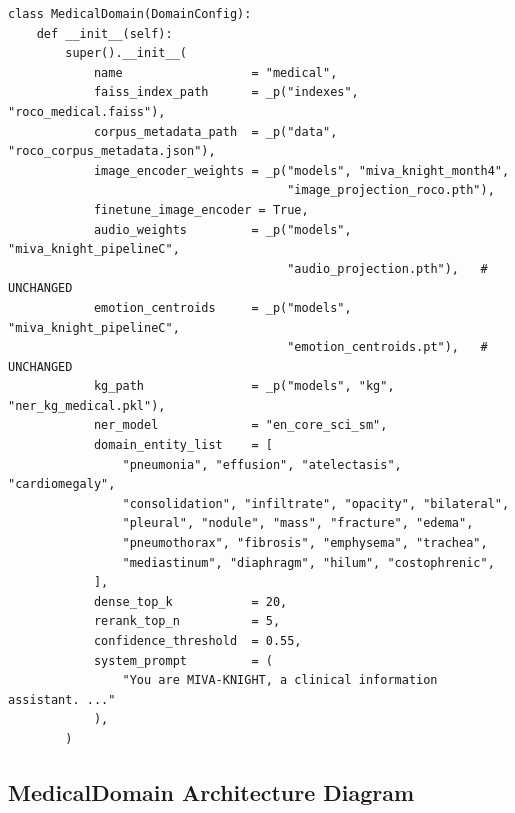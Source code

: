 \documentclass[12pt,a4paper]{article}
\theoremstyle{definition}
\theoremstyle{remark}
\begin{document}
\begin{lstlisting}[caption={\texttt{MedicalDomain} class}]
class MedicalDomain(DomainConfig):
    def __init__(self):
        super().__init__(
            name                  = "medical",
            faiss_index_path      = _p("indexes", "roco_medical.faiss"),
            corpus_metadata_path  = _p("data", "roco_corpus_metadata.json"),
            image_encoder_weights = _p("models", "miva_knight_month4",
                                       "image_projection_roco.pth"),
            finetune_image_encoder = True,
            audio_weights         = _p("models", "miva_knight_pipelineC",
                                       "audio_projection.pth"),   # UNCHANGED
            emotion_centroids     = _p("models", "miva_knight_pipelineC",
                                       "emotion_centroids.pt"),   # UNCHANGED
            kg_path               = _p("models", "kg", "ner_kg_medical.pkl"),
            ner_model             = "en_core_sci_sm",
            domain_entity_list    = [
                "pneumonia", "effusion", "atelectasis", "cardiomegaly",
                "consolidation", "infiltrate", "opacity", "bilateral",
                "pleural", "nodule", "mass", "fracture", "edema",
                "pneumothorax", "fibrosis", "emphysema", "trachea",
                "mediastinum", "diaphragm", "hilum", "costophrenic",
            ],
            dense_top_k           = 20,
            rerank_top_n          = 5,
            confidence_threshold  = 0.55,
            system_prompt         = (
                "You are MIVA-KNIGHT, a clinical information assistant. ..."
            ),
        )
\end{lstlisting}

\subsection{MedicalDomain Architecture Diagram}
\end{document}
